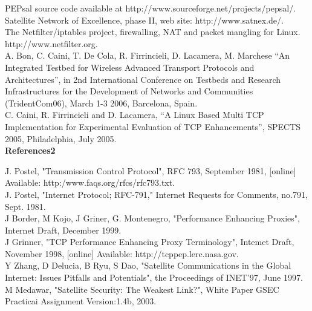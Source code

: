 \documentclass{uathesis}
\begin{document}
\noindent [15] PEPsal source code available at http://www.sourceforge.net/projects/pepsal/.  \\

\noindent [16] Satellite Network of Excellence, phase II, web site: http://www.satnex.de/. \\

\noindent [17] The Netfilter/iptables project, firewalling, NAT and packet mangling for Linux. http://www.netfilter.org. \\

\noindent [18] A. Bon, C. Caini, T. De Cola, R. Firrincieli, D. Lacamera, M. Marchese “An Integrated Testbed for Wireless Advanced Transport Protocols and Architectures”, in 2nd International Conference on Testbeds and Research Infrastructures for the Development of Networks and Communities (TridentCom06), March 1-3 2006, Barcelona, Spain. \\

\noindent [19] C. Caini, R. Firrincieli and D. Lacamera, “A Linux Based Multi TCP Implementation for Experimental Evaluation of TCP Enhancements”, SPECTS 2005, Philadelphia, July 2005. \\


\textbf{References2}

\noindent [1] J. Postel, "Transmission Control Protocol", RFC 793, September 1981, [online] Available: http:/www.faqs.org/rfcs/rfc793.txt. \\


\noindent [3] J. Postel, "Internet Protocol; RFC-791," Internet Requests for Comments, no.791, Sept. 1981.\\

\noindent [3] J Border, M Kojo, J Griner, G. Montenegro, "Performance Enhancing Proxies", Internet Draft, December 1999.\\

\noindent [4] J Grinner, "TCP Performance Enhancing Proxy Terminology", Intemet Draft, November 1998, [online] Available: http://tcppep.lerc.nasa.gov.\\

\noindent [5] Y Zhang, D Delucia, B Ryu, S Dao, "Satellite Communications in the Global Internet: Issues Pitfalls and Potentials", the Proceedings of INET'97, June 1997.\\

\noindent [6] M Medawar, "Satellite Security: The Weakest Link?", White Paper GSEC Practicai Assignment Version:1.4b, 2003.\\
\end{document}
